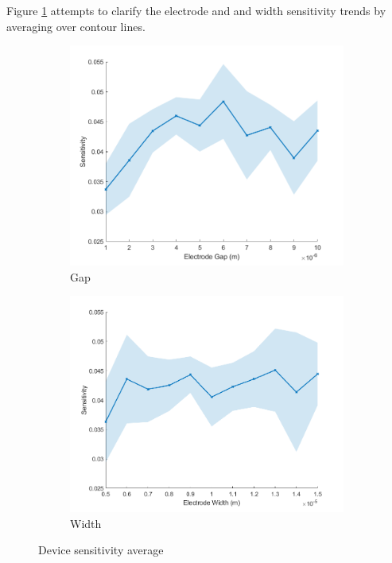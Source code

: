 \par Figure \ref{fig:device_sensitivity_average} attempts to clarify the electrode and and width sensitivity trends by averaging over contour lines.

\begin{figure}[h]
    \centering
    \begin{subfigure}[b]{0.49\textwidth}
        \centering
        \includegraphics[width=\textwidth]{images/comsol_device_gapXsensitivity_aveError.png}
        \caption{Gap}
    \end{subfigure}
    \hfill
    \begin{subfigure}[b]{0.49\textwidth}
        \centering
        \includegraphics[width=\textwidth]{images/comsol_device_widthXsensitivity_aveError.png}
        \caption{Width}
    \end{subfigure}
    \caption[Device sensitivity average]{Device sensitivity average}
    \label{fig:device_sensitivity_average}
\end{figure}


